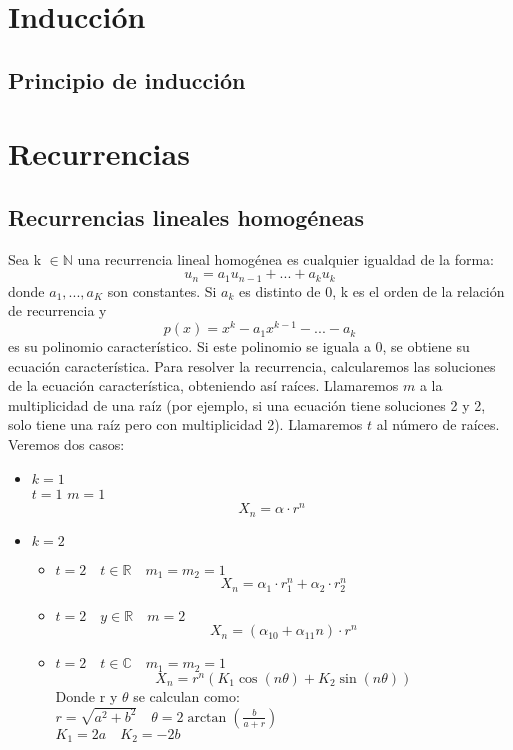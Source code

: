 \documentclass[a4paper]{article}
\title {\fbox{\Huge{\textbf{Resumen de lógica}}}}
\author {\fbox{Mapachana}}
\begin{document}
\maketitle


\section{Inducción}
\subsection{Principio de inducción}

\section{Recurrencias}
\subsection{Recurrencias lineales homogéneas}
\large{Sea} k $\in \mathbb{N}$ una recurrencia lineal homogénea es cualquier igualdad de la forma:
$$u_n=a_1u_{n-1}+...+a_ku_k$$
donde $a_1,...,a_K$ son constantes. Si $a_k$ es distinto de 0, k es el orden de la relación de recurrencia y
$$p(x)=x^k-a_1x^{k-1}-...-a_k$$
es su polinomio característico. Si este polinomio se iguala a 0, se obtiene su ecuación característica.
Para resolver la recurrencia, calcularemos las soluciones de la ecuación característica, obteniendo así raíces. Llamaremos $m$ a la multiplicidad de una raíz (por ejemplo, si una ecuación tiene soluciones 2 y 2, solo tiene una raíz pero con multiplicidad 2). Llamaremos $t$ al número de raíces.
Veremos dos casos:
\begin{itemize}
\item $k=1$\\
$t=1$ $m=1$
$$X_n=\alpha\cdot r^n$$
\item $k=2$
\begin{itemize}
\item $t=2 \quad t\in\mathbb{R} \quad m_1=m_2=1$
$$X_n=\alpha_1\cdot r_1^n+\alpha_2\cdot r_2^n$$
\item $t=2 \quad y\in\mathbb{R} \quad m=2$
$$X_n=(\alpha_{10}+\alpha_{11}n)\cdot r^n$$
\item $t=2 \quad t\in\mathbb{C} \quad m_1=m_2=1$
$$X_n=r^n\left(K_1\cos(n\theta) + K_2\sin(n\theta)\right)$$
Donde r y $\theta$ se calculan como:\\
$r=\sqrt{a^2+b^2} \quad \theta=2\arctan(\frac{b}{a+r})$\\
$K_1=2a \quad K_2=-2b$
\end{itemize}
\end{itemize}
\end{document}
